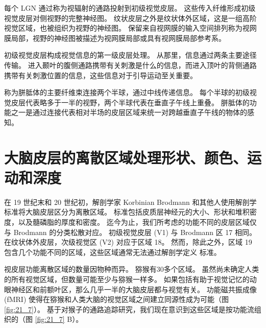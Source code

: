 每个 LGN 通过称为视辐射的通路投射到初级视觉皮层。 
这些传入纤维形成初级视觉皮层对侧视野的完整神经图。 
纹状皮层之外是纹状体外区域，这是一组高阶视觉区域，也被组织为视野的神经图。 
保留来自视网膜的输入空间排列称为视网膜局部，视野的神经图被描述为视网膜局部或具有视网膜局部参考系。


初级视觉皮层构成视觉信息的第一级皮层处理。 
从那里，信息通过两条主要途径传输。 
进入颞叶的腹侧通路携带有关刺激是什么的信息，而进入顶叶的背侧通路携带有关刺激位置的信息，这些信息对于引导运动至关重要。


称为胼胝体的主要纤维束连接两个半球，通过中线传递信息。 
每个半球的初级视觉皮层代表略多于一半的视野，两个半球代表在垂直子午线上重叠。 
胼胝体的功能之一是通过连接代表相对半场的皮层区域来统一对跨越垂直子午线的物体的感知。


\section{大脑皮层的离散区域处理形状、颜色、运动和深度}
在 19 世纪末和 20 世纪初，解剖学家 Korbinian Brodmann 和其他人使用解剖学标准将大脑皮层区分为离散区域。 
标准包括皮质层神经元的大小、形状和堆积密度，以及髓磷脂的厚度和密度。 
迄今为止，我们所考虑的功能不同的皮层区域仅与 Brodmann 的分类松散对应。 
初级视觉皮层 (V1) 与 Brodmann 区 17 相同。在纹状体外皮层，次级视觉区 (V2) 对应于区域 18。
然而，除此之外，区域 19 包含几个功能不同的区域，这些区域通常无法通过解剖学定义 标准。


视皮层功能离散区域的数量因物种而异。 
猕猴有30多个区域。 
虽然尚未确定人类的所有视觉区域，但数量可能至少与猕猴一样多。 
如果包括有助于视觉记忆的动眼神经区和前额叶区，那么几乎一半的大脑皮层都与视觉有关。 
功能磁共振成像 (fMRI) 使得在猕猴和人类大脑的视觉区域之间建立同源性成为可能（图 \ref{fig:21_7}）。 基于对猴子的通路追踪研究，我们现在意识到这些区域是按功能流组织的（图 \ref{fig:21_7} B）。

